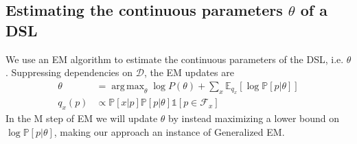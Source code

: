 \documentclass{article}
\DeclareMathOperator*{\argmax}{arg\,max} %
\newcommand{\indicator}{\mathds{1}} %
\newcommand{\expect}{\mathds{E}} %
\newcommand{\probability}{\mathds{P}} %
\begin{document}
\subsection{Estimating the continuous parameters $\theta$ of a DSL}\label{mapAppendix}
We use an EM algorithm to estimate the continuous parameters of the DSL, i.e. $\theta$.
Suppressing dependencies on $\mathcal{D}$, the EM updates are
\begin{align}
\label{maximizeStep}  \theta& = \argmax_\theta \log P(\theta) + \sum_x \expect_{q_x}\left[\log \probability\left[p|\theta \right] \right]\\
  q_x(p)&\propto \probability[x|p]\probability[p|\theta]\indicator\left[p\in \mathcal{F}_x \right]
\end{align}
In the M step of EM we will update $\theta$ by instead maximizing a lower bound on $\log \probability[p|\theta]$,
making our approach an instance of Generalized EM.
\end{document}
